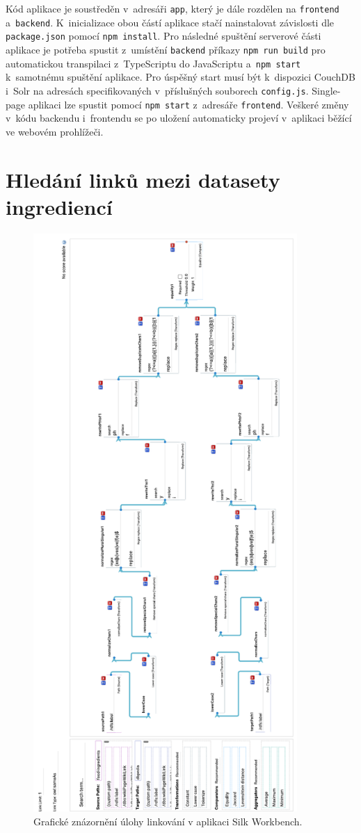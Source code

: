 \documentclass[12pt,a4paper]{report}
\begin{document}
Kód aplikace je soustředěn v~adresáři \texttt{app}, který je dále rozdělen na \texttt{frontend} a~\texttt{backend}. K~inicializace obou částí aplikace stačí nainstalovat závislosti dle \texttt{package.json} pomocí \texttt{npm\,install}. Pro následné spuštění serverové části aplikace je potřeba spustit z~umístění \texttt{backend} příkazy \texttt{npm\,run\,build} pro automatickou transpilaci z~TypeScriptu do JavaScriptu a~\texttt{npm\,start} k~samotnému spuštění aplikace. Pro úspěšný start musí být k~dispozici CouchDB i~Solr na adresách specifikovaných v~příslušných souborech \texttt{config.js}. Single-page aplikaci lze spustit pomocí \texttt{npm\,start} z~adresáře \texttt{frontend}. Veškeré změny v~kódu backendu i~frontendu se po uložení automaticky projeví v~aplikaci běžící ve webovém prohlížeči.

\pagebreak
\section{Hledání linků mezi datasety ingrediencí}

\begin{figure}[h!]\centering
\includegraphics[height=220mm]{../img/silk-workbench}
\caption{Grafické znázornění úlohy linkování v aplikaci Silk Workbench.}
\label{obr0a:silk-workbench}
\end{figure}
\end{document}

